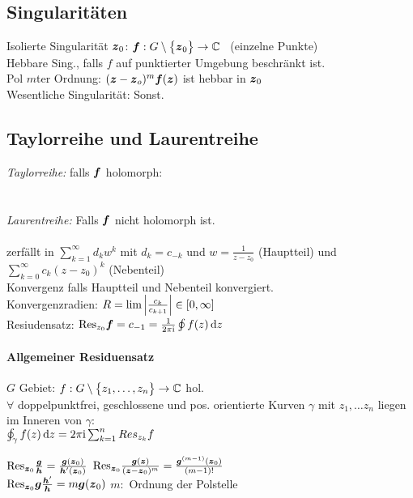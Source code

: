\documentclass[german,color]{latex4ei/latex4ei_fs}
\begin{document}
\begin{sectionbox}
	\subsection{Singularitäten}
	Isolierte Singularität $\boldsymbol{z}_0$: \quad $\boldsymbol{f} :G \setminus \bigl\{\boldsymbol{z}_0\bigr\} \rightarrow \mathbb C$ \ (einzelne Punkte)\\
	Hebbare Sing., falls $f$ auf punktierter Umgebung beschränkt ist.\\
	Pol $m$ter Ordnung: $(\boldsymbol{z} - \boldsymbol{z}_o)^m \boldsymbol{f}(\boldsymbol{z})$ ist hebbar in $\boldsymbol{z}_0$\\
	Wesentliche Singularität: Sonst.
\end{sectionbox}

\begin{sectionbox}
	\subsection{Taylorreihe und Laurentreihe}
	\emph{Taylorreihe:} falls $\boldsymbol{f}$ holomorph:\\
	\\
	\\
	\emph{Laurentreihe:} Falls $\boldsymbol{f}$ nicht holomorph ist.\\
	 \\
	zerfällt in $\sum \limits_{k=1}^{\infty} d_k w^k$ mit $d_k = c_{-k}$ und $w = \frac{1}{z - z_0}$ (Hauptteil) und $\sum \limits_{k = 0}^{\infty} c_k (z-z_0)^k$ (Nebenteil) \\
	Konvergenz falls Hauptteil und Nebenteil konvergiert. \\ 
	Konvergenzradien: $R = \lim \left\vert\frac{c_k}{c_{k+1}}\right\vert \in [0, \infty]$ \\ 
	Resiudensatz: $\mathrm{Res}_{z_0} \cx f = c_{-1} = \frac{1}{2\pi\i} \oint f(z) \diff z$
	
	\paragraph{Allgemeiner Residuensatz} $G$ Gebiet: $f:G \setminus \bigl\{z_1, \ldots, z_n\bigr\} \rightarrow \mathbb C$ hol. \\ 
	$\forall $ doppelpunktfrei, geschlossene und pos. orientierte Kurven $\gamma$ mit $z_1, \ldots z_n$ liegen im Inneren von $\gamma$: \\ 
	$\oint_\gamma f(z) \diff z = 2 \pi \i \sum_{k=1}^{n} Res_{z_k} f$
	
	\begin{emphbox}
		\raggedright
		$\mathrm{Res}_{\boldsymbol{z}_0} \frac{\boldsymbol{g}}{\boldsymbol{h}} = \frac{\boldsymbol{g}(\boldsymbol{z}_0)}{\boldsymbol{h}'(\boldsymbol{z}_0)}$ \qquad $\mathrm{Res}_{\boldsymbol{z}_0} \frac{\boldsymbol{g}(\boldsymbol{z})}{(\boldsymbol{z} - \boldsymbol{z}_0)^m} = \frac{\boldsymbol{g}^{(m-1)}(\boldsymbol{z}_0)}{(m-1)!}$\\
		$\mathrm{Res}_{\boldsymbol{z}_0} \boldsymbol{g} \frac{\boldsymbol{h}'}{\boldsymbol{h}} = m \boldsymbol{g}(\boldsymbol{z}_0)$ \qquad $m:$ Ordnung der Polstelle
	\end{emphbox}
\end{sectionbox}




\end{document}

